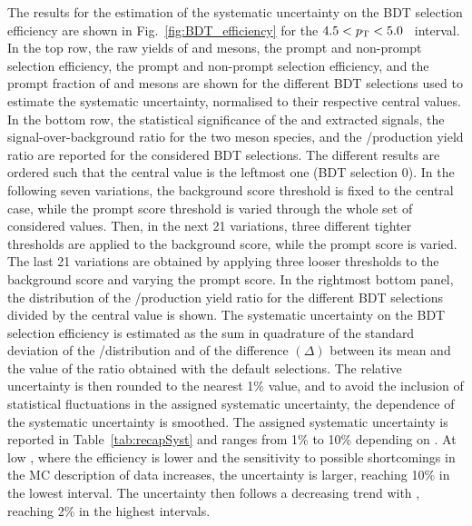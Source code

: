 The results for the estimation of the systematic uncertainty on the BDT selection efficiency are shown in Fig.~\ref{fig:BDT_efficiency} for the \mbox{$4.5<p_\mathrm{T}<5.0$~\gevc} \pt interval. In the top row, the raw yields of \ds and \dpl mesons, the prompt and non-prompt \ds selection efficiency, the prompt and non-prompt \dpl selection efficiency, and the prompt fraction of \ds and \dpl mesons are shown for the different BDT selections used to estimate the systematic uncertainty, normalised to their respective central values. In the bottom row, the statistical significance of the \ds and \dpl extracted signals, the signal-over-background ratio for the two meson species, and the \ds/\dpl production yield ratio are reported for the considered BDT selections. The different results are ordered such that the central value is the leftmost one (BDT selection 0). In the following seven variations, the background score threshold is fixed to the central case, while the prompt score threshold is varied through the whole set of considered values. Then, in the next 21 variations, three different tighter thresholds are applied to the background score, while the prompt score is varied. The last 21 variations are obtained by applying three looser thresholds to the background score and varying the prompt score. In the rightmost bottom panel, the distribution of the \ds/\dpl production yield ratio for the different BDT selections divided by the central value is shown. The systematic uncertainty on the BDT selection efficiency is estimated as the sum in quadrature of the standard deviation of the \ds/\dpl distribution and of the difference $(\Delta)$ between its mean and the value of the ratio obtained with the default selections. The relative uncertainty is then rounded to the nearest 1\% value, and to avoid the inclusion of statistical fluctuations in the assigned systematic uncertainty, the \pt dependence of the systematic uncertainty is smoothed. The assigned systematic uncertainty is reported in Table~\ref{tab:recapSyst} and ranges from 1\% to 10\% depending on \pt. At low \pt, where the efficiency is lower and the sensitivity to possible shortcomings in the MC description of data increases, the uncertainty is larger, reaching 10\% in the lowest \pt interval. The uncertainty then follows a decreasing trend with \pt, reaching 2\% in the highest \pt intervals.

